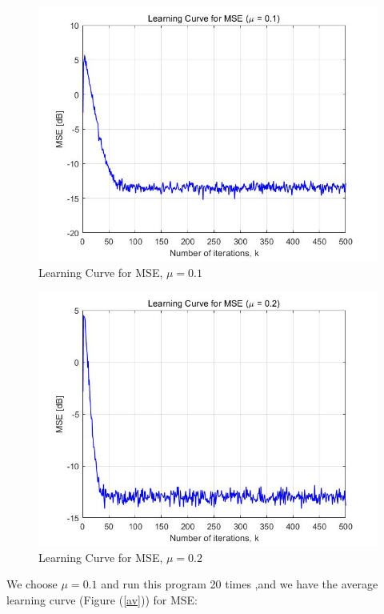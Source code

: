 \documentclass[UTF-8, a4paper, 12pt]{ctexart}
\begin{document}
\begin{figure}[htbp]
    \centering
    \includegraphics[width=13cm]{3.26/mu1_curve.jpg}
    \caption{Learning Curve for MSE, $\mu=0.1$}
\end{figure}

\begin{figure}[htbp]
    \centering
    \includegraphics[width=13cm]{3.26/mu2_curve.jpg}
    \caption{Learning Curve for MSE, $\mu=0.2$}
\end{figure}

\newpage

We choose  $\mu=0.1$ and run this program 20 times ,and we have the average learning curve (Figure (\ref{av})) for MSE:
\end{document}
